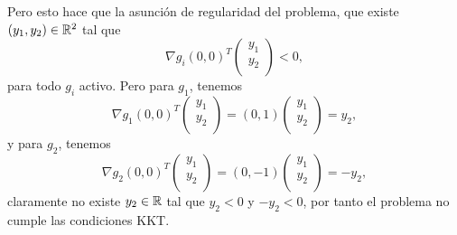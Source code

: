 Pero esto hace que la asunción de regularidad del problema,
que existe $(y_1, y_2) \in \mathbb{R}^2$ tal que
\begin{equation*}
    \nabla g_i(0, 0)^T
    \begin{pmatrix}
        y_1 \\
        y_2 \\
    \end{pmatrix}
    < 0,
\end{equation*}
para todo $g_i$ activo.
Pero para $g_1$, tenemos
\begin{equation*}
    \nabla g_1(0, 0)^T
    \begin{pmatrix}
        y_1 \\
        y_2 \\
    \end{pmatrix}
    = (0, 1)
    \begin{pmatrix}
        y_1 \\
        y_2 \\
    \end{pmatrix}
    = y_2,
\end{equation*}
y para $g_2$, tenemos
\begin{equation*}
    \nabla g_2(0, 0)^T
    \begin{pmatrix}
        y_1 \\
        y_2 \\
    \end{pmatrix}
    = (0, -1)
    \begin{pmatrix}
        y_1 \\
        y_2 \\
    \end{pmatrix}
    = -y_2,
\end{equation*}
claramente no existe $y_2 \in \mathbb{R}$ tal que $y_2 < 0$ y $-y_2 < 0$,
por tanto el problema no cumple las condiciones KKT.
